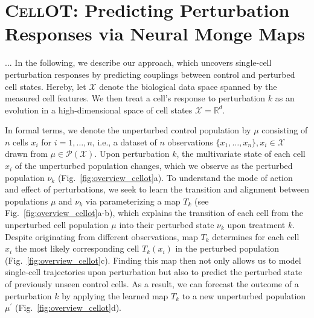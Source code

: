 \section{\textsc{CellOT}: Predicting Perturbation Responses via Neural Monge Maps}

...
In the following, we describe our approach, which uncovers single-cell perturbation responses by predicting couplings between control and perturbed cell states.
Hereby, let $\mathcal{X}$ denote the biological data space spanned by the measured cell features. We then treat a cell's response to perturbation $k$ as an evolution in a high-dimensional space of cell states $\mathcal{X} = \mathbb{R}^d$.

In formal terms, we denote the unperturbed control population by $\mu$ consisting of $n$ cells $x_i$ for $i = 1, \dots, n$, i.e., a dataset of $n$ observations $\{ x_1, \dots, x_n \}, x_i \in \mathcal{X}$ drawn from $\mu \in \mathcal{P}(\mathcal{X})$. Upon perturbation $k$, the multivariate state of each cell $x_i$ of the unperturbed population changes, which we observe as the perturbed population $\nu_k$ (Fig.~\ref{fig:overview_cellot}a).
To understand the mode of action and effect of perturbations, we seek to learn the transition and alignment between populations $\mu$ and $\nu_k$ via parameterizing a map $T_k$ (see Fig.~\ref{fig:overview_cellot}a-b), which explains the transition of each cell from the unperturbed cell population $\mu$ into their perturbed state $\nu_k$ upon treatment $k$.
Despite originating from  different observations, map $T_k$ determines for each cell $x_i$ the most likely corresponding cell $T_k(x_i)$ in the perturbed population (Fig.~\ref{fig:overview_cellot}c).
Finding this map then not only allows us to model single-cell trajectories upon perturbation but also to predict the perturbed state of previously unseen control cells. As a result, we can forecast the outcome of a perturbation $k$  by applying the learned map $T_k$ to a new unperturbed population $\mu^\prime$ (Fig.~\ref{fig:overview_cellot}d).


